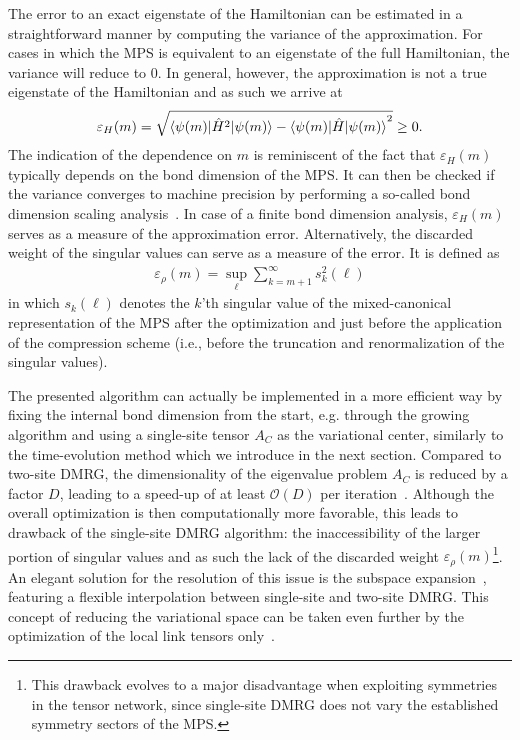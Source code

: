 \documentclass{svmono}
\begin{document}
The error to an exact eigenstate of the Hamiltonian can be estimated in a straightforward manner by computing the variance of the approximation.
For cases in which the MPS is equivalent to an eigenstate of the full Hamiltonian, the variance will reduce to $0$. In general, however, the approximation is not a true eigenstate of the Hamiltonian and as such we arrive at
\begin{align}
    \varepsilon_H(m) = \sqrt{\braket{\psi(m)|\hat H^2|\psi(m)} - \braket{\psi(m)|\hat H|\psi(m)}^2}\geq 0.
\end{align}
The indication of the dependence on $m$ is reminiscent of the fact that $\varepsilon_H(m)$ typically depends on the bond dimension of the MPS.
It can then be checked if the variance converges to machine precision by performing a so-called bond dimension scaling analysis~\cite{Hubig2018}.
In case of a finite bond dimension analysis, $\varepsilon_H(m)$ serves as a measure of the approximation error.
Alternatively, the discarded weight of the singular values can serve as a measure of the error.
It is defined as
\begin{align}
    \varepsilon_\rho(m) = \sup_{\ell}\sum_{k=m+1}^\infty s_k^2(\ell)
\end{align}
in which $s_k(\ell)$ denotes the $k$'th singular value of the mixed-canonical representation of the MPS after the optimization and just before the application of the compression scheme (i.e., before the truncation and renormalization of the singular values).

The presented algorithm can actually be implemented in a more efficient way by fixing the internal bond dimension from the start, e.g. through the growing algorithm and using a single-site tensor $A_C$ as the variational center, similarly to the time-evolution method which we introduce in the next section.
Compared to two-site DMRG, the dimensionality of the eigenvalue problem $A_C$ is reduced by a factor $D$, leading to a speed-up of at least $\mathcal O(D)$ per iteration~\cite{White2005}.
Although the overall optimization is then computationally more favorable, this leads to drawback of the single-site DMRG algorithm: the inaccessibility of the larger portion of singular values and as such the lack of the discarded weight $\varepsilon_\rho(m)$\footnote{This drawback evolves to a major disadvantage when exploiting symmetries in the tensor network, since single-site DMRG does not vary the established symmetry sectors of the MPS.}.
An elegant solution for the resolution of this issue is the subspace expansion~\cite{Hubig2015}, featuring a flexible interpolation between single-site and two-site DMRG.
This concept of reducing the variational space can be taken even further by the optimization of the local link tensors only~\cite{Fernandez2020}.
\end{document}
